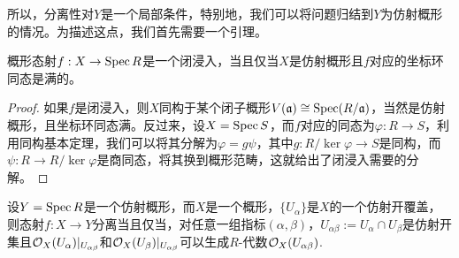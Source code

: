 所以，分离性对$Y$是一个局部条件，特别地，我们可以将问题归结到$Y$为仿射概形的情况。为描述这点，我们首先需要一个引理。

\begin{lem}
概形态射$f:X\to \operatorname{Spec} R$是一个闭浸入，当且仅当$X$是仿射概形且$f$对应的坐标环同态是满的。
\end{lem}

\begin{proof}
如果$f$是闭浸入，则$X$同构于某个闭子概形$V(\mathfrak{a})\cong \operatorname{Spec} (R/\mathfrak a)$，当然是仿射概形，且坐标环同态满。反过来，设$X=\operatorname{Spec} S$，而$f$对应的同态为$\varphi:R\to S$，利用同构基本定理，我们可以将其分解为$\varphi=g\psi$，其中$g:R/\ker \varphi\to S$是同构，而$\psi:R\to R/\ker\varphi$是商同态，将其换到概形范畴，这就给出了闭浸入需要的分解。
\end{proof}

\begin{pro}
	设$Y=\operatorname{Spec} R$是一个仿射概形，而$X$是一个概形，$\{U_\alpha\}$是$X$的一个仿射开覆盖，则态射$f:X\to Y$分离当且仅当，对任意一组指标$(\alpha,\beta)$，$U_{\alpha\beta}:=U_\alpha\cap U_\beta$是仿射开集且$\mathcal{O}_X(U_{\alpha})|_{U_{\alpha\beta}}$和$\mathcal{O}_X(U_{\beta})|_{U_{\alpha\beta}}$可以生成$R$-代数$\mathcal{O}_X(U_{\alpha\beta})$.
\end{pro}

